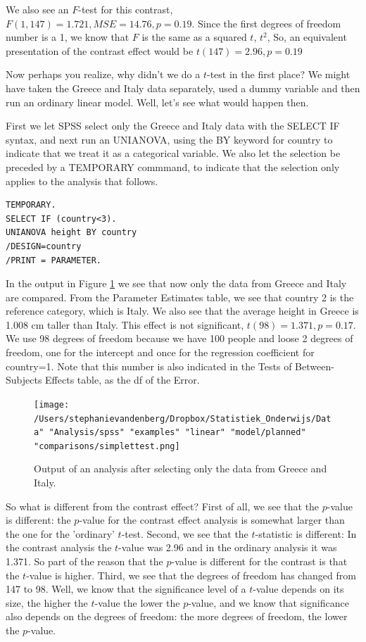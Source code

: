 \documentclass[]{book}\usepackage[]{graphicx}\usepackage[]{color}
\begin{document}
We also see an $F$-test for this contrast, $F(1, 147)=1.721, MSE= 14.76, p=0.19$.
Since the first degrees of freedom number is a 1, we know that $F$ is the same as a squared $t$, $t^2$, So, an equivalent presentation of the contrast effect would be $t(147)=2.96, p=0.19$

Now perhaps you realize, why didn't we do a $t$-test in the first place? We might have taken the Greece and Italy data separately, used a dummy variable and then run an ordinary linear model. Well, let's see what would happen then.

First we let SPSS select only the Greece and Italy data with the SELECT IF syntax, and next run an UNIANOVA, using the BY keyword for country to indicate that we treat it as a categorical variable. We also let the selection be preceded by a TEMPORARY commmand, to indicate that the selection only applies to the analysis that follows.

\begin{verbatim}
TEMPORARY.
SELECT IF (country<3).
UNIANOVA height BY country
/DESIGN=country
/PRINT = PARAMETER.  
\end{verbatim}


In the output in Figure \ref{fig:simplettest} we see that now only the data from Greece and Italy are compared. From the Parameter Estimates table, we see that country 2 is the reference category, which is Italy. We also see that the average height in Greece is 1.008 cm taller than Italy. This effect is not significant, $t(98)=1.371,p=0.17$. We use 98 degrees of freedom because we have 100 people and loose 2 degrees of freedom, one for the intercept and once for the regression coefficient for country=1. Note that this number is also indicated in the Tests of Between-Subjects Effects table, as the df of the Error.

\begin{figure}[h]
    \begin{center}
       \texttt{[image: /Users/stephanievandenberg/Dropbox/Statistiek\_Onderwijs/Data" "Analysis/spss" "examples" "linear" "model/planned" "comparisons/simplettest.png]}
    \end{center}
    \caption{Output of an analysis after selecting only the data from Greece and Italy.}
        \label{fig:simplettest}
\end{figure}

 

So what is different from the contrast effect? First of all, we see that the $p$-value is different: the $p$-value for the contrast effect analysis is somewhat larger than the one for the 'ordinary' $t$-test. Second, we see that the $t$-statistic is different: In the contrast analysis the $t$-value was 2.96 and in the ordinary analysis it was 1.371. So part of the reason that the $p$-value is different for the contrast is that the $t$-value is higher. Third, we see that the degrees of freedom has changed from 147 to 98. Well, we know that the significance level of a $t$-value depends on its size, the higher the $t$-value the lower the $p$-value, and we know that significance also depends on the degrees of freedom: the more degrees of freedom, the lower the $p$-value. 
\end{document}
